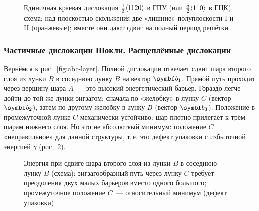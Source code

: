 \begin{figure}[ht]
\centering
{}
\caption{Единичная краевая дислокация $\frac13\langle 11\bar{2}0\rangle$ в ГПУ (или
$\frac a2\langle 110\rangle$ в ГЦК), схема: над плоскостью скольжения две
«лишние» полуплоскости I и II (оранжевые); вместе они дают сдвиг на полный
период решётки}
\label{fig:hcp-edge}
\end{figure}

\subsubsection{Частичные дислокации Шокли. Расщеплённые дислокации}

Вернёмся к рис.~\ref{fig:abc-layer}. Полной дислокации отвечает сдвиг
шара второго слоя из лунки $B$ в соседнюю лунку $B$ на вектор $\vb b_1$.
Прямой путь проходит через вершину шара $A$~— это высокий энергетический
барьер. Гораздо легче дойти до той же лунки зигзагом: сначала по
«желобку» в лунку $C$ (вектор $\vb b_2$), затем по другому желобку в
лунку $B$ (вектор $\vb b_3$). Положение в промежуточной лунке $C$
механически устойчиво: шар плотно прилегает к трём шарам нижнего слоя.
Но это не абсолютный минимум: положение $C$ «неправильное» для данной
структуры, т.\,е. это дефект упаковки с избыточной энергией $\gamma$
(рис.~\ref{fig:shockley-energy}).

\begin{figure}[ht]
\centering
{}
\caption{Энергия при сдвиге шара второго слоя из лунки $B$ в соседнюю
лунку $B$ (схема): зигзагообразный путь через лунку $C$ требует
преодоления двух малых барьеров вместо одного большого; промежуточное
положение $C$~— относительный минимум (дефект упаковки)}
\label{fig:shockley-energy}
\end{figure}

